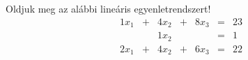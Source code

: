 \begin{exercise}{Oldjuk meg az alábbi lineáris egyenletrendszert!}
	\[
		\begin{array}{*{7}{c}}
			1 x_{1} & + & 4 x_{2} & + & 8 x_{3} & = & 23 \\
			        &   & 1 x_{2} &   &         & = & 1  \\
			2 x_{1} & + & 4 x_{2} & + & 6 x_{3} & = & 22
		\end{array}
	\]
\end{exercise}
